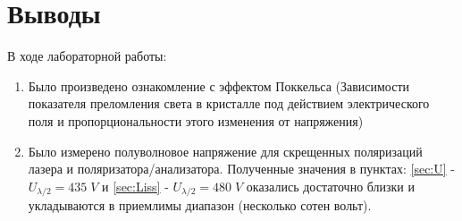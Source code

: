 \documentclass{article}
\begin{document}
\section{Выводы}
В ходе лабораторной работы:
\begin{enumerate}
  \item Было произведено ознакомление с эффектом Поккельса (Зависимости показателя преломления света в кристалле под действием
  электрического поля и пропорциональности этого изменения от напряжения)
  \item Было измерено полуволновое напряжение для скрещенных поляризаций лазера и поляризатора/анализатора. Полученные значения
  в пунктах: \ref{sec:U} - \(U_{\lambda/2} = 435\;V \) и \ref{sec:Liss} - \(U_{\lambda/2} = 480\;V \) оказались достаточно близки
  и укладываются в приемлимы диапазон (несколько сотен вольт).
\end{enumerate}
\end{document}
